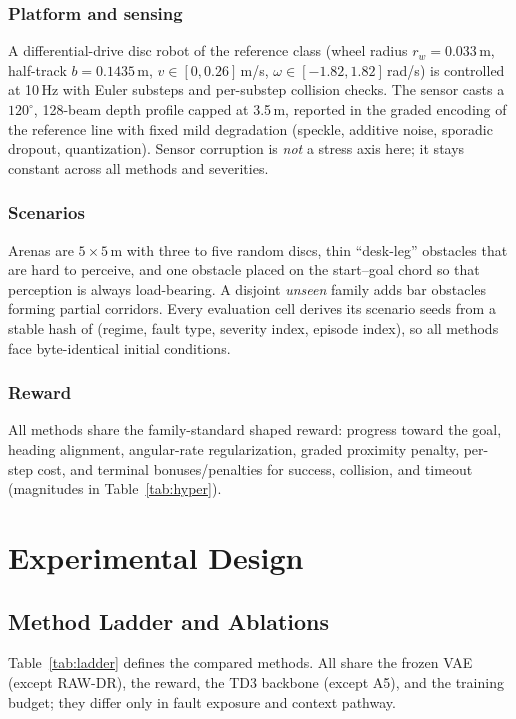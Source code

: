 \documentclass[journal]{IEEEtran}
\begin{document}
\subsubsection{Platform and sensing}
A differential-drive disc robot of the reference class (wheel radius
$r_w{=}0.033$\,m, half-track $b{=}0.1435$\,m, $v \in [0, 0.26]$\,m/s,
$\omega \in [-1.82, 1.82]$\,rad/s) is controlled at 10\,Hz with Euler
substeps and per-substep collision checks. The sensor casts a
$120^{\circ}$, 128-beam depth profile capped at 3.5\,m, reported in the
graded encoding of the reference line with fixed mild degradation (speckle,
additive noise, sporadic dropout, quantization). Sensor corruption is
\emph{not} a stress axis here; it stays constant across all methods and
severities.

\subsubsection{Scenarios}
Arenas are $5{\times}5$\,m with three to five random discs, thin
``desk-leg'' obstacles that are hard to perceive, and one obstacle placed on
the start--goal chord so that perception is always load-bearing. A disjoint
\emph{unseen} family adds bar obstacles forming partial corridors. Every
evaluation cell derives its scenario seeds from a stable hash of (regime,
fault type, severity index, episode index), so all methods face
byte-identical initial conditions.

\subsubsection{Reward}
All methods share the family-standard shaped reward: progress toward the
goal, heading alignment, angular-rate regularization, graded proximity
penalty, per-step cost, and terminal bonuses/penalties for success,
collision, and timeout (magnitudes in Table~\ref{tab:hyper}).

\section{Experimental Design}\label{sec:design}
\subsection{Method Ladder and Ablations}
Table~\ref{tab:ladder} defines the compared methods. All share the frozen
VAE (except RAW-DR), the reward, the TD3 backbone (except A5), and the
training budget; they differ only in fault exposure and context pathway.
\end{document}
